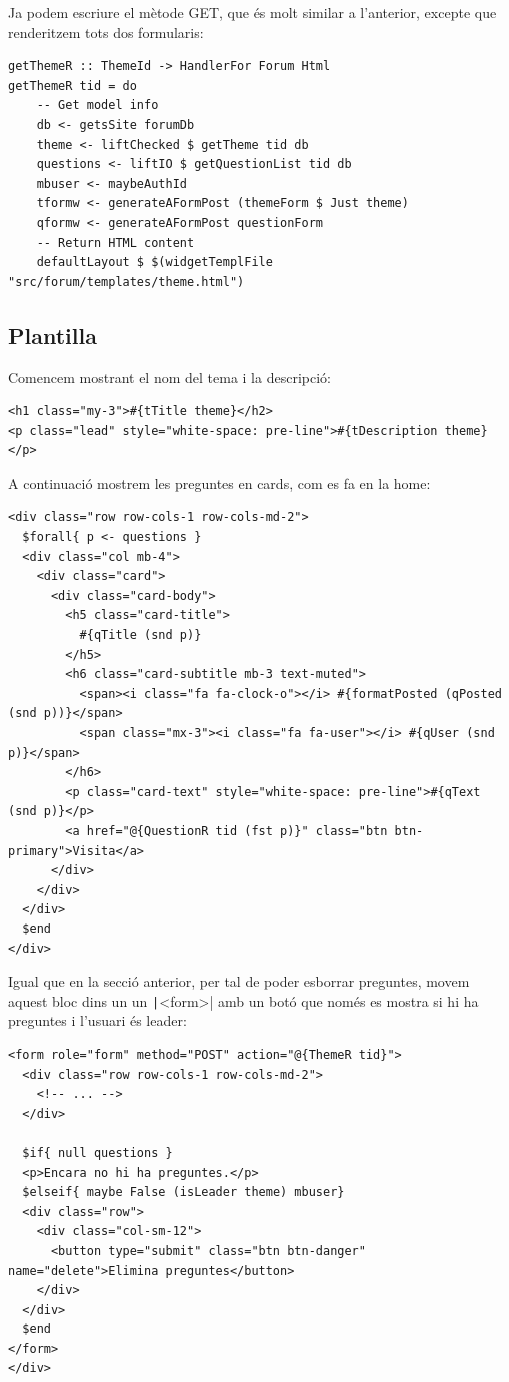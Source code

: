 \documentclass[catalan, a4paper]{scrartcl}
\begin{document}
Ja podem escriure el mètode \textsf{GET}, que és molt similar
a l'anterior, excepte que renderitzem tots dos formularis:

\begin{verbatim}
getThemeR :: ThemeId -> HandlerFor Forum Html
getThemeR tid = do
    -- Get model info
    db <- getsSite forumDb
    theme <- liftChecked $ getTheme tid db
    questions <- liftIO $ getQuestionList tid db
    mbuser <- maybeAuthId
    tformw <- generateAFormPost (themeForm $ Just theme)
    qformw <- generateAFormPost questionForm
    -- Return HTML content
    defaultLayout $ $(widgetTemplFile "src/forum/templates/theme.html")
\end{verbatim}

\subsection*{Plantilla}

Comencem mostrant el nom del tema i la descripció:

\begin{verbatim}
<h1 class="my-3">#{tTitle theme}</h2>
<p class="lead" style="white-space: pre-line">#{tDescription theme}</p>
\end{verbatim}

A continuació mostrem les preguntes en cards, com es fa en la home:

\begin{verbatim}
<div class="row row-cols-1 row-cols-md-2">
  $forall{ p <- questions }
  <div class="col mb-4">
    <div class="card">
      <div class="card-body">
        <h5 class="card-title">
          #{qTitle (snd p)}
        </h5>
        <h6 class="card-subtitle mb-3 text-muted">
          <span><i class="fa fa-clock-o"></i> #{formatPosted (qPosted (snd p))}</span>
          <span class="mx-3"><i class="fa fa-user"></i> #{qUser (snd p)}</span>
        </h6>
        <p class="card-text" style="white-space: pre-line">#{qText (snd p)}</p>
        <a href="@{QuestionR tid (fst p)}" class="btn btn-primary">Visita</a>
      </div>
    </div>
  </div>
  $end
</div>
\end{verbatim}

Igual que en la secció anterior, per tal de poder esborrar preguntes,
movem aquest bloc dins un un \texttt|<form>| amb un botó
que només es mostra si hi ha preguntes i l'usuari és leader:

\begin{verbatim}
<form role="form" method="POST" action="@{ThemeR tid}">
  <div class="row row-cols-1 row-cols-md-2">
    <!-- ... -->
  </div>

  $if{ null questions }
  <p>Encara no hi ha preguntes.</p>
  $elseif{ maybe False (isLeader theme) mbuser}
  <div class="row">
    <div class="col-sm-12">
      <button type="submit" class="btn btn-danger" name="delete">Elimina preguntes</button>
    </div>
  </div>
  $end
</form>
</div>
\end{verbatim}
\end{document}
